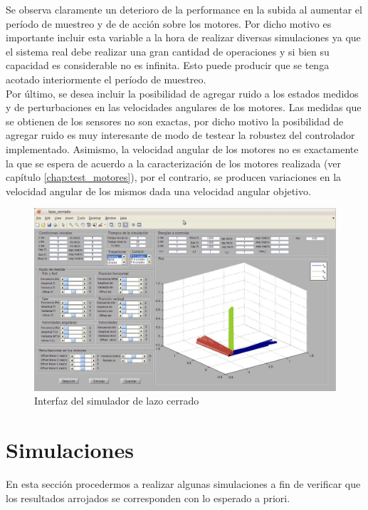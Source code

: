 \documentclass[main]{subfiles}
\begin{document}
Se observa claramente un deterioro de la performance en la subida al aumentar el per\'iodo de muestreo y de de acci\'on sobre los motores. Por dicho motivo es importante incluir esta variable a la hora de realizar diversas simulaciones ya que el sistema real debe realizar una gran cantidad de operaciones y si bien su capacidad es considerable no es infinita. Esto puede producir que se tenga acotado interiormente el per\'iodo de muestreo.\\

Por \'ultimo, se desea incluir la posibilidad de agregar ruido a los estados medidos y de perturbaciones en las velocidades angulares de los motores. Las medidas que se obtienen de los sensores no son exactas, por dicho motivo la posibilidad de agregar ruido es muy interesante de modo de testear la robustez del controlador implementado. Asimismo, la velocidad angular de los motores no es exactamente la que se espera de acuerdo a la caracterizaci\'on de los motores realizada (ver cap\'itulo \ref{chap:test_motores}), por el contrario, se producen variaciones en la velocidad angular de los mismos dada una velocidad angular objetivo.
  \begin{figure}[h!]
	\centering
	\includegraphics[width=1\textwidth]{./pics_simulador/vistac.pdf}
	\caption{Interfaz del simulador de lazo cerrado}
	\label{fig:vistac}
\end{figure}

\section{Simulaciones}
En esta secci\'on procedermos a realizar algunas simulaciones a fin de verificar que los resultados arrojados se corresponden con lo esperado a priori. 
\end{document}
